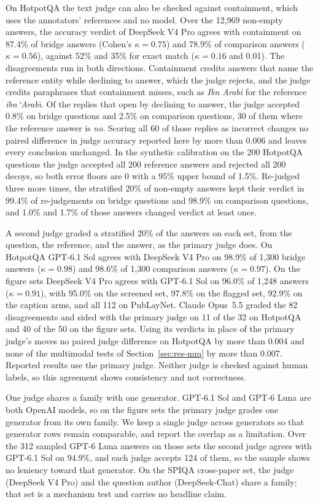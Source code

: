 \documentclass[preprint,12pt]{elsarticle}
\begin{document}
On HotpotQA the text judge can also be checked against containment, which
uses the annotators' references and no model. Over the 12{,}969 non-empty
answers, the accuracy verdict of DeepSeek V4 Pro agrees with containment on
87.4\% of bridge answers (Cohen's $\kappa=0.75$) and 78.9\% of comparison
answers ($\kappa=0.56$), against 52\% and 35\% for exact match ($\kappa=0.16$
and 0.01). The disagreements run in both directions. Containment credits
answers that name the reference entity while declining to answer, which the
judge rejects, and the judge credits paraphrases that containment misses,
such as \emph{Ibn Arabi} for the reference \emph{ibn\,`Arab\={\i}}. Of the replies that open by
declining to answer, the judge accepted 0.8\% on bridge questions and 2.5\% on
comparison questions, 30 of them where the reference answer is \emph{no}.
Scoring all 60 of those replies as incorrect changes no paired difference in
judge accuracy reported here by more than 0.006 and leaves every conclusion
unchanged.
In the synthetic calibration on the 200 HotpotQA questions the judge accepted
all 200 reference answers and rejected all 200 decoys, so both error floors
are 0 with a 95\% upper bound of 1.5\%. Re-judged three more times, the
stratified 20\% of non-empty answers kept their verdict in 99.4\% of
re-judgements on bridge questions and 98.9\% on comparison questions, and
1.0\% and 1.7\% of those answers changed verdict at least once.

A second judge graded a stratified 20\% of the answers on each set, from the
question, the reference, and the answer, as the primary judge does. On HotpotQA
GPT-6.1 Sol agrees with DeepSeek V4 Pro on 98.9\% of 1{,}300 bridge answers
($\kappa=0.98$) and 98.6\% of 1{,}300 comparison answers ($\kappa=0.97$). On the
figure sets DeepSeek V4 Pro agrees with GPT-6.1 Sol on 96.0\% of 1{,}248 answers
($\kappa=0.91$), with 95.0\% on the screened set, 97.8\% on the flagged set,
92.9\% on the caption arms, and all 112 on PubLayNet. Claude Opus~5.5 graded the
82 disagreements and sided with the primary judge on 11 of the 32 on HotpotQA
and 40 of the 50 on the figure sets. Using its verdicts in place of the primary
judge's moves no paired judge difference on HotpotQA by more than 0.004 and none
of the multimodal tests of Section~\ref{sec:res-mm} by more than 0.007. Reported
results use the primary judge. Neither judge is checked against human labels, so
this agreement shows consistency and not correctness.

One judge shares a family with one generator. GPT-6.1 Sol and GPT-6 Luna are
both OpenAI models, so on the figure sets the primary judge grades one
generator from its own family. We keep a single judge across generators so that
generator rows remain comparable, and report the overlap as a limitation.
Over the 312 sampled GPT-6 Luna answers on those sets the second judge agrees
with GPT-6.1 Sol on 94.9\%, and each judge accepts 124 of them, so the sample
shows no leniency toward that generator. On the SPIQA cross-paper set, the judge (DeepSeek V4 Pro) and
the question author (DeepSeek-Chat) share a family; that set is a mechanism
test and carries no headline claim.
\end{document}
